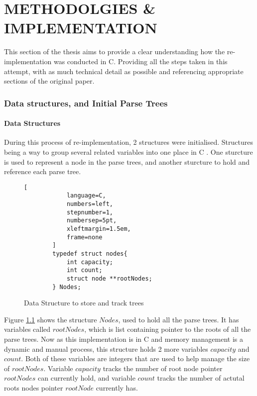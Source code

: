 \chapter{METHODOLGIES \& IMPLEMENTATION}

This section of the thesis aims to provide a clear understanding how the re-implementation was conducted in C. Providing all the steps taken in this attempt, with as much technical detail as possible and referencing appropriate sections of the original paper.

\subsection{Data structures, and Initial Parse Trees}
\subsubsection{Data Structures}
During this process of re-implementation, 2 structures were initialised. Structures being a way to group several related variables into one place in C \cite{w3schoolStructuresStructs2025}. One sturcture is used to represent a node in the parse trees, and another sturcture to hold and reference each parse tree.
\begin{figure}[H]

    \begin{tcolorbox}[title=Nodes Structure for storing trees, colback=white, colframe=black]
        \begin{lstlisting}[
            language=C,
            numbers=left,
            stepnumber=1,
            numbersep=5pt,
            xleftmargin=1.5em,
            frame=none
        ]
        typedef struct nodes{
            int capacity;
            int count;
            struct node **rootNodes;
        } Nodes;
        \end{lstlisting}

    \end{tcolorbox}

\caption{Data Structure to store and track trees}
\label{fig:Data_Structures1}
\end{figure}

Figure \ref{fig:Data_Structures1} shows the structure $Nodes$, used to hold all the parse trees. It has variables called $rootNodes$, which is list containing pointer to the roots of all the parse trees. Now as this implementation is in C and memory management is a dynamic and manual process, this structure holds 2 more variables $capacity$ and $count$. Both of these variables are integers that are used to help manage the size of $rootNodes$. Variable $capacity$ tracks the number of root node pointer $rootNodes$ can currently hold, and variable $count$ tracks the number of actutal roots nodes pointer $rootNode$ currently has.

